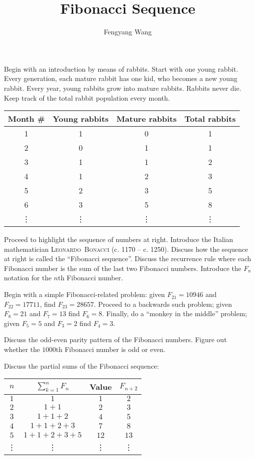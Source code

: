 \documentclass[letterpaper,10pt]{article}
\title{Fibonacci Sequence}
\author{Fengyang Wang}
\begin{document}
\maketitle

Begin with an introduction by means of rabbits. Start with one young rabbit.
Every generation, each mature rabbit has one kid, who becomes a new young rabbit.
Every year, young rabbits grow into mature rabbits. Rabbits never die.
Keep track of the total rabbit population every month.

\begin{center}
 \begin{tabular}{|c|c|c|c|}
  \hline
  Month \# & Young rabbits & Mature rabbits & Total rabbits \\
  \hline
  1 & 1 & 0 & 1 \\
  2 & 0 & 1 & 1 \\
  3 & 1 & 1 & 2 \\
  4 & 1 & 2 & 3 \\
  5 & 2 & 3 & 5 \\
  6 & 3 & 5 & 8 \\
  \vdots & \vdots & \vdots & \vdots \\
  \hline
 \end{tabular}
\end{center}

Proceed to highlight the sequence of numbers at right. Introduce the Italian
mathematician \textsc{Leonardo~Bonacci} (c. 1170 -- c. 1250). Discuss how the
sequence at right is called the ``Fibonacci sequence''. Discuss the recurrence
rule where each Fibonacci number is the sum of the last two Fibonacci numbers.
Introduce the $F_n$ notation for the $n$th Fibonacci number.

Begin with a simple Fibonacci-related problem: given $F_{21}=10946$ and $F_{22}=17711$, find
$F_{23}=28657$. Proceed to a backwards such problem; given $F_8=21$ and $F_7=13$ find $F_6=8$.
Finally, do a ``monkey in the middle'' problem; given $F_5=5$ and $F_3=2$ find $F_4=3$.

Discuss the odd-even parity pattern of the Fibonacci numbers. Figure out
whether the $1000$th Fibonacci number is odd or even.

Discuss the partial sums of the Fibonacci sequence:

\begin{center}
 \begin{tabular}{|c|c|c|c|}
  \hline
  $n$ & $\displaystyle \sum_{k=1}^n F_n$ & Value & $F_{n+2}$ \\
  \hline
  $1$ & $1$ & $1$ & $2$ \\
  $2$ & $1+1$ & $2$ & $3$ \\
  $3$ & $1+1+2$ & $4$ & $5$ \\
  $4$ & $1+1+2+3$ & $7$ & $8$ \\
  $5$ & $1+1+2+3+5$ & $12$ & $13$ \\
  \vdots & \vdots & \vdots & \vdots \\
  \hline
 \end{tabular}
\end{center}
\end{document}
